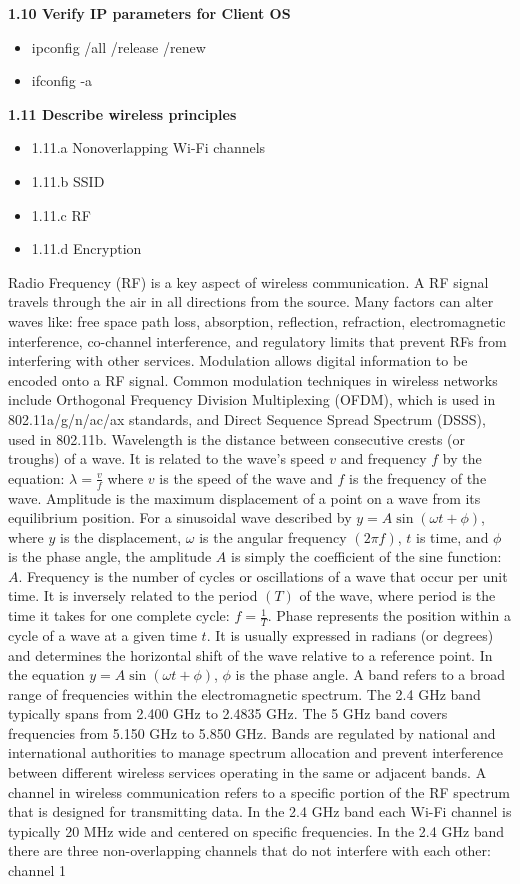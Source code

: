 \documentclass{article}
\begin{document}
\noindent\textbf{1.10 Verify IP parameters for Client OS}
\begin{itemize}
\item ipconfig /all /release /renew
\item ifconfig -a
\end{itemize}
 
\noindent\textbf{1.11 Describe wireless principles}
\begin{itemize}
\item 1.11.a Nonoverlapping Wi-Fi channels
\item 1.11.b SSID
\item 1.11.c RF
\item 1.11.d Encryption
\end{itemize}
  
	Radio Frequency (RF) is a key aspect of wireless communication. A RF signal travels through the air in all directions from the source. Many factors can alter waves like: free space path loss, absorption, reflection, refraction, electromagnetic interference, co-channel interference, and regulatory limits that prevent RFs from interfering with other services. Modulation allows digital information to be encoded onto a RF signal. Common modulation techniques in wireless networks include Orthogonal Frequency Division Multiplexing (OFDM), which is used in 802.11a/g/n/ac/ax standards, and Direct Sequence Spread Spectrum (DSSS), used in 802.11b. Wavelength is the distance between consecutive crests (or troughs) of a wave. It is related to the wave's speed $v$ and frequency $f$ by the equation: $\lambda = \frac{v}{f}$ where $v$ is the speed of the wave and $f$ is the frequency of the wave. Amplitude is the maximum displacement of a point on a wave from its equilibrium position. For a sinusoidal wave described by $y = A \sin(\omega t + \phi)$, where $y$ is the displacement, $\omega$ is the angular frequency $(2\pi f)$, $t$ is time, and $\phi$ is the phase angle, the amplitude $A$ is simply the coefficient of the sine function: $A$. Frequency is the number of cycles or oscillations of a wave that occur per unit time. It is inversely related to the period $(T)$ of the wave, where period is the time it takes for one complete cycle: $f = \frac{1}{T}$. Phase represents the position within a cycle of a wave at a given time $t$. It is usually expressed in radians (or degrees) and determines the horizontal shift of the wave relative to a reference point. In the equation $y = A \sin(\omega t + \phi)$, $\phi$ is the phase angle. A band refers to a broad range of frequencies within the electromagnetic spectrum. The 2.4 GHz band typically spans from 2.400 GHz to 2.4835 GHz. The 5 GHz band covers frequencies from 5.150 GHz to 5.850 GHz. Bands are regulated by national and international authorities to manage spectrum allocation and prevent interference between different wireless services operating in the same or adjacent bands. A channel in wireless communication refers to a specific portion of the RF spectrum that is designed for transmitting data. In the 2.4 GHz band each Wi-Fi channel is typically 20 MHz wide and centered on specific frequencies. In the 2.4 GHz band there are three non-overlapping channels that do not interfere with each other: channel 1 
\end{document}

